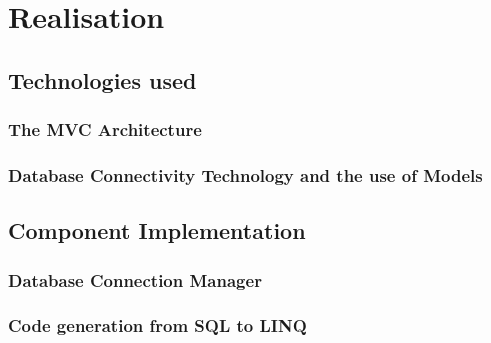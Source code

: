 \chapter{Realisation}

\section{Technologies used}
\subsection{The MVC Architecture}
\subsection{Database Connectivity Technology and the use of Models}

\section{Component Implementation}
\subsection{Database Connection Manager}
\subsection{Code generation from SQL to LINQ}


